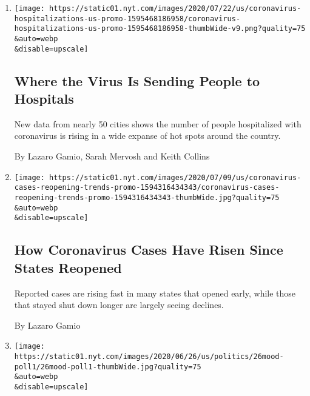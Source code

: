 \begin{enumerate}
\def\labelenumi{\arabic{enumi}.}
\item
  \href{/interactive/2020/07/23/us/coronavirus-hospitalizations-us.html}{}

  \texttt{[image: https://static01.nyt.com/images/2020/07/22/us/coronavirus-hospitalizations-us-promo-1595468186958/coronavirus-hospitalizations-us-promo-1595468186958-thumbWide-v9.png?quality=75\\\&auto=webp\\\&disable=upscale]}

  \hypertarget{where-the-virus-is-sending-people-to-hospitals}{%
  \subsection{Where the Virus Is Sending People to
  Hospitals}\label{where-the-virus-is-sending-people-to-hospitals}}

  New data from nearly 50 cities shows the number of people hospitalized
  with coronavirus is rising in a wide expanse of hot spots around the
  country.

  By Lazaro Gamio, Sarah Mervosh and Keith Collins
\item
  \href{/interactive/2020/07/09/us/coronavirus-cases-reopening-trends.html}{}

  \texttt{[image: https://static01.nyt.com/images/2020/07/09/us/coronavirus-cases-reopening-trends-promo-1594316434343/coronavirus-cases-reopening-trends-promo-1594316434343-thumbWide.jpg?quality=75\\\&auto=webp\\\&disable=upscale]}

  \hypertarget{how-coronavirus-cases-have-risen-since-states-reopened}{%
  \subsection{How Coronavirus Cases Have Risen Since States
  Reopened}\label{how-coronavirus-cases-have-risen-since-states-reopened}}

  Reported cases are rising fast in many states that opened early, while
  those that stayed shut down longer are largely seeing declines.

  By Lazaro Gamio
\item
  \href{/2020/06/27/us/politics/coronavirus-trump-mood-poll.html}{}

  \texttt{[image: https://static01.nyt.com/images/2020/06/26/us/politics/26mood-poll1/26mood-poll1-thumbWide.jpg?quality=75\\\&auto=webp\\\&disable=upscale]}

  \hypertarget{how-americans-feel-about-the-country-right-now-anxious-hopeful}{%
}
\end{enumerate}
